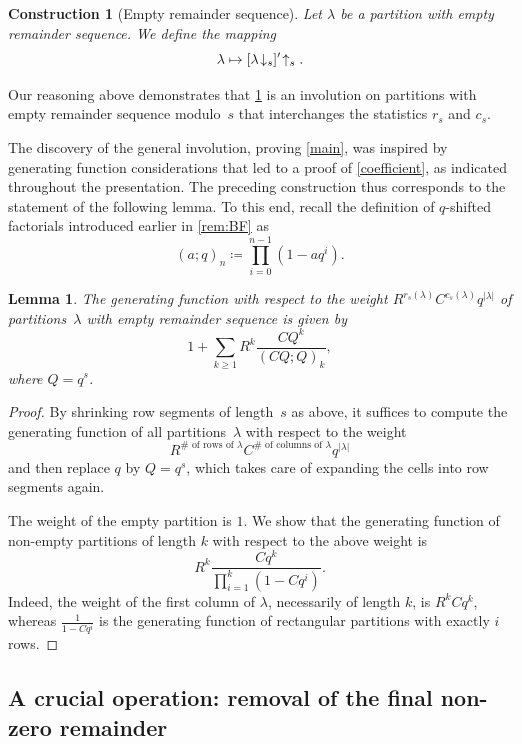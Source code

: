 \documentclass[12pt,reqno]{amsart}
\numberwithin{equation}{section}
\newtheorem{lemma}[theorem]{Lemma}
\newtheorem{construction}{Construction}
\theoremstyle{definition}
\newcommand{\lab}[1]{\hbox{${\lambda}\!\downarrow_{#1}$}}
\begin{document}
\begin{construction}[\sc Empty remainder sequence] \label{const:1}
Let $\lambda$ be a partition with empty remainder sequence. We define the mapping
  $$\lambda \mapsto [\lab{s}]' \!\uparrow_s.$$
\end{construction}
Our reasoning above demonstrates that \cref{const:1} is an involution on
partitions with empty remainder sequence modulo~$s$ that interchanges the statistics $r_s$ and $c_s$.

The discovery of the general involution, proving 
\cref{main}, was inspired by generating function considerations
that led to a proof of \cref{coefficient}, as indicated throughout the presentation.  The preceding construction thus corresponds to the statement of the following lemma.  
To this end, recall the definition of $q$-shifted factorials introduced earlier in \cref{rem:BF} as
\[
(a;q)_n \coloneq \prod_{i=0}^{n-1}(1-a q^i).
\]

\begin{lemma}
\label{zero}
The generating function with respect to the weight $R^{r_s(\lambda)} C^{c_s(\lambda)} q^{|\lambda|}$
of partitions~$\lambda$ with empty remainder sequence is given by
$$
1 + \sum_{k \ge 1} R^k \frac{C Q^{k}}{(C Q; Q)_k},
$$
where $Q=q^s$.
\end{lemma}

\begin{proof}
By shrinking row segments of length~$s$ as above, it suffices to compute the generating function of all partitions~$\lambda$ with respect to the weight
$$
R^{\# \text{ of rows of $\lambda$}} C^{\# \text{ of columns of $\lambda$}} q^{|\lambda|}
$$
and then replace $q$ by $Q=q^s$, which takes care of expanding the cells into row segments again.

The weight of the empty partition is $1$.  We show that the
generating function of non-empty partitions of length $k$ with respect to the above weight is
\[
R^k \frac{C q^{k}}{\prod_{i=1}^{k}(1-C q^{i})}.
\]
Indeed, the weight of the first column of $\lambda$, necessarily of
length $k$, is $R^k C q^k$, whereas $\frac{1}{1-Cq^i}$ is the
generating function of rectangular partitions with exactly $i$ rows.
\end{proof}


\subsection{A crucial operation: 
removal of the final non-zero remainder}
\label{crucial}
\end{document}
